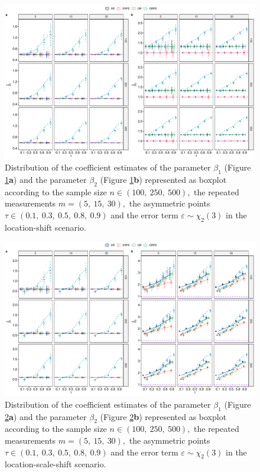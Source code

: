\documentclass[15pt,a4paper]{article}
\begin{document}
\begin{center}
\begin{figure}[H]
\includegraphics[width=0.8\linewidth]{Graph_supp/gchi1_erfe}
 \caption{Distribution of the coefficient estimates of the parameter $\beta_1$ (Figure \ref{fig:gchi1_erfe}\textbf{a}) and the parameter $\beta_2$ (Figure \ref{fig:gchi1_erfe}\textbf{b}) represented as boxplot according to the sample size $n\in(100,  \ 250,  \ 500),$ the repeated measurements $m=(5,\ 15,\ 30),$ the asymmetric points $\tau\in (0.1,  \ 0.3,  \  0.5, \  0.8,\ 0.9)$ and the error term $\varepsilon\sim\chi_2(3)$ in the location-shift scenario.}\label{fig:gchi1_erfe}
\end{figure}
\end{center}

\begin{center}
\begin{figure}[H]
\includegraphics[width=0.8\linewidth]{Graph_supp/gchi2_erfe}
 \caption{Distribution of the coefficient estimates of the parameter $\beta_1$ (Figure \ref{fig:gchi2_erfe}\textbf{a}) and the parameter $\beta_2$ (Figure \ref{fig:gchi2_erfe}\textbf{b}) represented as boxplot according to the sample size $n\in(100,  \ 250,  \ 500),$ the repeated measurements $m=(5,\ 15,\ 30),$ the asymmetric points $\tau\in (0.1,  \ 0.3,  \  0.5, \  0.8,\ 0.9)$ and the error term $\varepsilon\sim\chi_2(3)$ in the location-scale-shift scenario.}\label{fig:gchi2_erfe}
\end{figure}
\end{center} 
\end{document}

